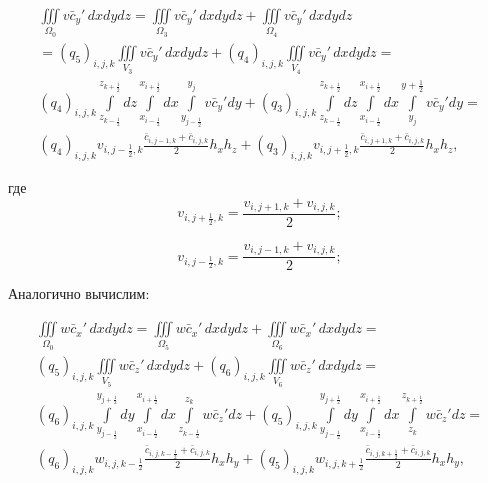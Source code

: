 \documentclass[12pt]{article}
\begin{document}
\begin{multline*}
	\iiint\limits_{\Omega_0} v\bar{c}_y'\,dxdydz = 
	\iiint\limits_{\Omega_3} v\bar{c}_y'\,dxdydz + 
	\iiint\limits_{\Omega_4} v\bar{c}_y'\,dxdydz \\  
	= (q_5)_{i,j,k}\iiint\limits_{V_3} v\bar{c}_y'\,dxdydz +
	 (q_4)_{i,j,k}\iiint\limits_{V_4} v\bar{c}_y'\,dxdydz = \\
	 (q_4)_{i,j,k}\int\limits_{z_{k-\frac{1}{2}}}^{z_{k+\frac{1}{2}}}dz\int\limits_{x_{i-\frac{1}{2}}}^{x_{i+\frac{1}{2}}}dx\int\limits_{y_{j-\frac{1}{2}}}^{y_j}v\bar{c}_y'dy + (q_3)_{i,j,k}\int\limits_{z_{k-\frac{1}{2}}}^{z_{k+\frac{1}{2}}}dz\int\limits_{x_{i-\frac{1}{2}}}^{x_{i+\frac{1}{2}}}dx\int\limits_{y_j}^{y+\frac{1}{2}}v\bar{c}_y'dy = \\
	 (q_4)_{i,j,k}v_{i,j-\frac{1}{2},k}\frac{\bar{c}_{i,j-1,k}+\bar{c}_{i,j,k}}{2}h_xh_z + (q_3)_{i,j,k}v_{i,j+\frac{1}{2},k}\frac{\bar{c}_{i,j+1,k}+\bar{c}_{i,j,k}}{2}h_xh_z,
\end{multline*}

где 
\begin{equation*} 
	v_{{i,j+\frac{1}{2}},k} = \frac{v_{i,j+1,k}+v_{i,j,k}}{2};
\end{equation*}

\begin{equation*} 
	v_{{i,j-\frac{1}{2}},k} = \frac{v_{i,j-1,k}+v_{i,j,k}}{2};
\end{equation*}

Аналогично вычислим:

\begin{multline*}
	\iiint\limits_{\Omega_0} w\bar{c}_x'\,dxdydz = \iiint\limits_{\Omega_5} w\bar{c}_x'\,dxdydz + \iiint\limits_{\Omega_6} w\bar{c}_x'\,dxdydz = \\
	(q_5)_{i,j,k}\iiint\limits_{V_5} w\bar{c}_z'\,dxdydz +
	(q_6)_{i,j,k}\iiint\limits_{V_6} w\bar{c}_z'\,dxdydz = \\
	(q_6)_{i,j,k}\int\limits_{y_{j-\frac{1}{2}}}^{y_{j+\frac{1}{2}}}dy\int\limits_{x_{i-\frac{1}{2}}}^{x_{i+\frac{1}{2}}}dx\int\limits_{z_{k-\frac{1}{2}}}^{z_k}w\bar{c}_z'dz + (q_5)_{i,j,k}\int\limits_{y_{j-\frac{1}{2}}}^{y_{j+\frac{1}{2}}}dy\int\limits_{x_{i-\frac{1}{2}}}^{x_{i+\frac{1}{2}}}dx\int\limits_{z_k}^{z_{k+\frac{1}{2}}}w\bar{c}_z'dz = \\
	(q_6)_{i,j,k}w_{i,j,k-\frac{1}{2}}\frac{\bar{c}_{i,j,k-\frac{1}{2}}+\bar{c}_{i,j,k}}{2}h_xh_y + (q_5)_{i,j,k}w_{i,j,k+\frac{1}{2}}\frac{\bar{c}_{i,j,k+\frac{1}{2}}+\bar{c}_{i,j,k}}{2}h_xh_y,
\end{multline*}
\end{document}
